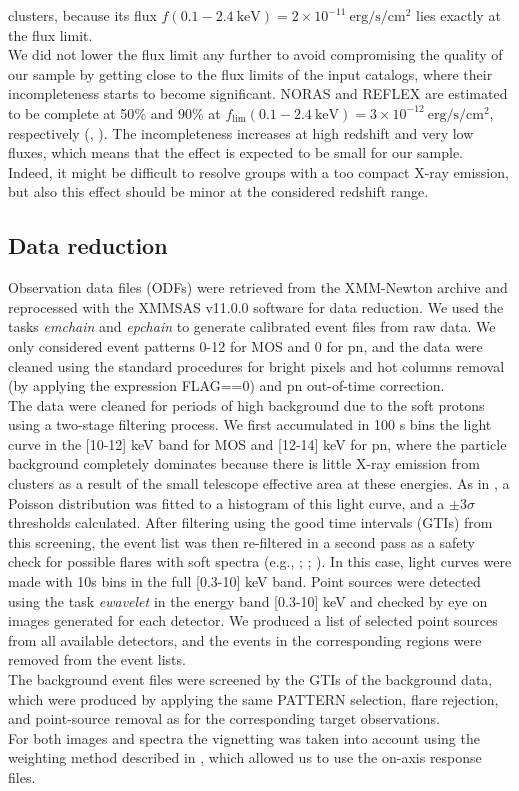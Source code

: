 \documentclass{aa} %
\begin{document}
clusters, because its flux $f(0.1-2.4 \ \text{keV}) = 2\times10^{-11}
\ \text{erg/s/cm$^{2}$}$ lies exactly at the flux limit.\\
We did not lower the flux limit any further to avoid
compromising the quality of our sample by getting close to the flux limits of the input catalogs, where their incompleteness starts to
become significant. NORAS and REFLEX are estimated to be complete at
50$\%$ and $90\%$ at $f_{\text{lim}}
(0.1-2.4 \ \text{keV}) = 3\times10^{-12} \
\text{erg/s/cm$^{2}$}$, respectively (\citealt{2000ApJS..129..435B}, \citealt{2004A&A...425..367B}). The incompleteness increases at
high redshift and very low fluxes, which means that the effect is expected to be small for our sample. Indeed, it might be difficult to resolve
groups with a too compact X-ray emission, but also this effect should
be minor at the considered redshift range.


\subsection{Data reduction}
Observation data files (ODFs) were retrieved from the XMM-Newton archive and
reprocessed with the XMMSAS v11.0.0 software for data reduction. We
used the tasks {\it emchain} and {\it epchain} to generate calibrated event
files from raw data. We only considered event patterns 0-12 for MOS
and 0 for pn, and the data were cleaned using the standard procedures
for bright pixels and hot columns removal (by applying the expression
FLAG==0) and pn out-of-time correction.\\
The data were cleaned for periods of high background due to the soft
protons using a two-stage filtering process. We first accumulated in
100 s bins the light curve in the [10-12] keV band for MOS and [12-14]
keV for pn, where the particle background completely dominates because
there is little X-ray emission from clusters as a result of the small telescope
effective area at these energies. As in \citet{2002A&A...394..375P}, a Poisson distribution was fitted to a
histogram of this light curve, and a $\pm3\sigma$ thresholds
calculated. After filtering using the good time intervals (GTIs) from this
screening, the event list was then re-filtered in a second pass as a
safety check for possible flares with soft spectra
(e.g., \citealt{2004A&A...419..837D}; \citealt{2005ApJ...629..172N};
\citealt{2005A&A...443..721P}). In this case, light curves were made
with 10s bins in the full [0.3-10] keV band. Point sources were detected using the task {\it ewavelet} in the
energy band [0.3-10] keV and checked by eye on images generated for
each detector. We produced a list of selected point sources from all
available detectors, and the events in the corresponding regions were
removed from the event lists.\\ The background event
files were screened by the GTIs of the background
data, which were produced by applying the same PATTERN selection, flare
rejection, and point-source removal as for the corresponding target
observations.\\
For both images and spectra the vignetting was taken into account using
the weighting method described in \cite{2001A&A...365L..80A}, which
allowed us to use the on-axis response files.
\end{document}
